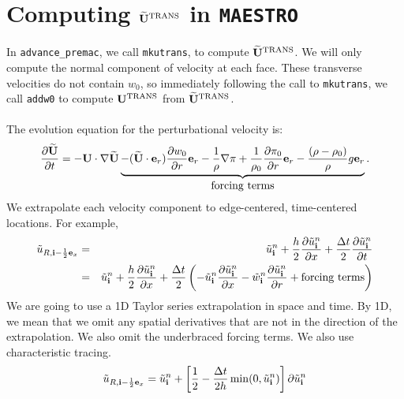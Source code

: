 \section{Computing $\widetilde{{\bf U}}^{\rm TRANS}$ in {\tt MAESTRO}}
In {\tt advance\_premac}, we call {\tt mkutrans}, to compute
$\widetilde{{\bf U}}^{\rm TRANS}$.  We will only compute the normal
component of velocity at each face.
These transverse velocities do not contain $w_0$, so immediately
following the call to {\tt mkutrans}, we call {\tt addw0} to compute
${\bf U}^{\rm TRANS}$ from $\widetilde{{\bf U}}^{\rm TRANS}$.\\ \\
The evolution equation for the perturbational velocity is:
\begin{equation}
\frac{\partial\widetilde{{\bf U}}}{\partial t} = -{\bf U}\cdot\nabla\widetilde{{\bf U}} \underbrace{- (\widetilde{{\bf U}}\cdot{\bf e}_r)\frac{\partial w_0}{\partial r}{\bf e}_r - \frac{1}{\rho}\nabla\pi + \frac{1}{\rho_0}\frac{\partial\pi_0}{\partial r}{\bf e}_r - \frac{(\rho-\rho_0)}{\rho}g{\bf e}_r}_{\hbox{forcing terms}}.\label{Perturbational Velocity Equation}
\end{equation}
We extrapolate each velocity component to edge-centered, time-centered locations.  For example,
\begin{eqnarray}
\tilde{u}_{R,{\bf i}-\frac{1}{2}{\bf e}_x} &=& \tilde{u}_{{\bf i}}^n + \frac{h}{2}\frac{\partial\tilde{u}_{{\bf i}}^n}{\partial x} + \frac{\Delta t}{2}\frac{\partial\tilde{u}_{{\bf i}}^n}{\partial t} \nonumber \\
&=& \tilde{u}_{{\bf i}}^n + \frac{h}{2}\frac{\partial\tilde{u}_{{\bf i}}^n}{\partial x} + \frac{\Delta t}{2}
\left(-\tilde{u}_{{\bf i}}^n\frac{\partial\tilde{u}_{{\bf i}}^n}{\partial x} - \tilde{w}_{{\bf i}}^n\frac{\partial\tilde{u}_{{\bf i}}^n}{\partial r} + \text{forcing terms}\right)
\end{eqnarray}
We are going to use a 1D Taylor series extrapolation in space and time.
By 1D, we mean that we omit any spatial derivatives that are not in the 
direction of the extrapolation.  We also omit the underbraced forcing terms.
We also use characteristic tracing.
\begin{equation}
\tilde{u}_{R,{\bf i}-\frac{1}{2}{\bf e}_x} = \tilde{u}_{{\bf i}}^n + \left[\frac{1}{2} - \frac{\Delta t}{2h}\min(0,\tilde{u}_{{\bf i}}^n)\right]\partial\tilde{u}_{{\bf i}}^n
\end{equation}


\newpage

